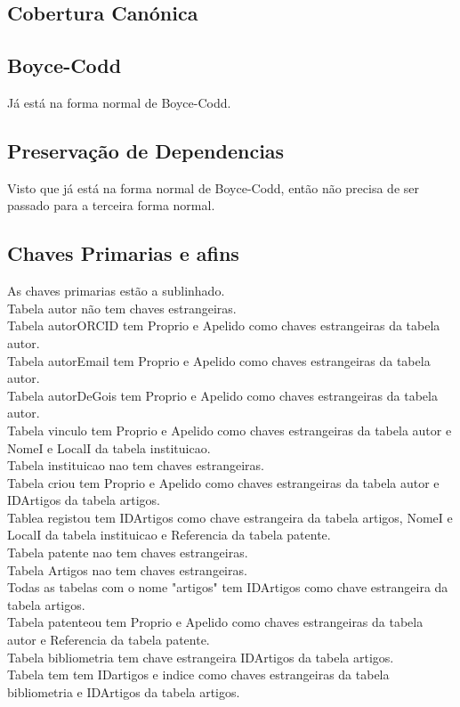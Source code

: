 \documentclass[a4paper]{article}
\begin{document}
\newpage
\subsection{Cobertura Canónica}

\newpage
\subsection{Boyce-Codd}
Já está na forma normal de Boyce-Codd.

\subsection{Preservação de Dependencias}
Visto que já está na forma normal de Boyce-Codd, então não precisa de ser passado para a terceira forma normal.

\subsection{Chaves Primarias e afins}
As chaves primarias estão a sublinhado.\\
Tabela autor não tem chaves estrangeiras.\\
Tabela autorORCID tem Proprio e Apelido como chaves estrangeiras da tabela autor.\\
Tabela autorEmail tem Proprio e Apelido como chaves estrangeiras da tabela autor.\\
Tabela autorDeGois tem Proprio e Apelido como chaves estrangeiras da tabela autor.\\
Tabela vinculo tem Proprio e Apelido como chaves estrangeiras da tabela autor e NomeI e LocalI da tabela instituicao.\\
Tabela instituicao nao tem chaves estrangeiras.\\
Tabela criou tem Proprio e Apelido como chaves estrangeiras da tabela autor e IDArtigos da tabela artigos.\\
Tablea registou tem IDArtigos como chave estrangeira da tabela artigos, NomeI e LocalI da tabela instituicao e Referencia da tabela patente.\\
Tabela patente nao tem chaves estrangeiras.\\
Tabela Artigos nao tem chaves estrangeiras.\\
Todas as tabelas com o nome "artigos" tem IDArtigos como chave estrangeira da tabela artigos.\\
Tabela patenteou tem Proprio e Apelido como chaves estrangeiras da tabela autor e Referencia da tabela patente.\\
Tabela bibliometria tem chave estrangeira IDArtigos da tabela artigos.\\
Tabela tem tem IDartigos e indice como chaves estrangeiras da tabela bibliometria e IDArtigos da tabela artigos.\\
\end{document}
